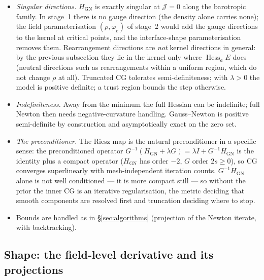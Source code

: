 \documentclass[11pt]{article}
\newcommand{\Jf}{\mathscr{J}}  %
\begin{document}
\begin{itemize}
\item \emph{Singular directions.} $H_{\mathrm{GN}}$ is exactly singular at
  $\Jf  = 0$ along the barotropic family. In stage~1 there is no gauge
  direction (the density alone carries none); the field parameterisation
  $(\rho,\varphi_e)$ of stage~2 would add the gauge directions to the
  kernel at critical points, and the interface-shape parameterisation
  removes them. Rearrangement directions are \emph{not} kernel directions
  in general: by the previous subsection they lie in the kernel only where
  $\operatorname{Hess}_aE$ does (neutral directions such as rearrangements
  within a uniform region, which do not change $\rho$ at all). Truncated
  CG tolerates semi-definiteness; with $\lambda > 0$ the model is
  positive definite; a trust region bounds the step otherwise.
\item \emph{Indefiniteness.} Away from the minimum the full Hessian can
  be indefinite; full Newton then needs negative-curvature handling.
  Gauss--Newton is positive semi-definite by construction and asymptotically
  exact on the zero set.
\item \emph{The preconditioner.} The Riesz map is the natural
  preconditioner in a specific sense: the preconditioned operator
  $G^{-1}(H_{\mathrm{GN}} + \lambda G) = \lambda I + G^{-1}H_{\mathrm{GN}}$
  is the identity plus a compact operator ($H_{\mathrm{GN}}$ has order
  $-2$, $G$ order $2s \ge 0$), so CG converges superlinearly with
  mesh-independent iteration counts. $G^{-1}H_{\mathrm{GN}}$ alone is not
  well conditioned --- it is more compact still --- so without the prior
  the inner CG is an iterative regularisation, the metric deciding that
  smooth components are resolved first and truncation deciding where to
  stop.
\item Bounds are handled as in \S\ref{sec:algorithms} (projection of the
  Newton iterate, with backtracking).
\end{itemize}

\subsection{Shape: the field-level derivative and its projections}
\label{sec:shape-second}
\end{document}
